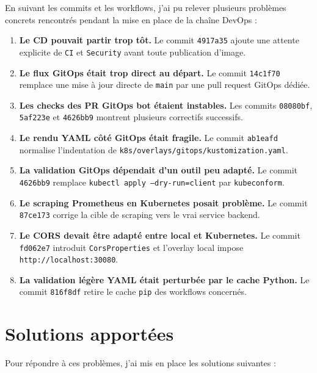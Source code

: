 \documentclass[10pt,a4paper]{article}
\begin{document}
En suivant les commits et les workflows, j'ai pu relever plusieurs problèmes concrets rencontrés pendant la mise en place de la chaîne DevOps :

\begin{enumerate}
\item \textbf{Le CD pouvait partir trop tôt.} Le commit \texttt{4917a35} ajoute une attente explicite de \texttt{CI} et \texttt{Security} avant toute publication d'image.
\item \textbf{Le flux GitOps était trop direct au départ.} Le commit \texttt{14c1f70} remplace une mise à jour directe de \texttt{main} par une pull request GitOps dédiée.
\item \textbf{Les checks des PR GitOps bot étaient instables.} Les commits \texttt{08080bf}, \texttt{5af223e} et \texttt{4626bb9} montrent plusieurs correctifs successifs.
\item \textbf{Le rendu YAML côté GitOps était fragile.} Le commit \texttt{ab1eafd} normalise l'indentation de \texttt{k8s/overlays/gitops/kustomization.yaml}.
\item \textbf{La validation GitOps dépendait d'un outil peu adapté.} Le commit \texttt{4626bb9} remplace \texttt{kubectl apply --dry-run=client} par \texttt{kubeconform}.
\item \textbf{Le scraping Prometheus en Kubernetes posait problème.} Le commit \texttt{87ce173} corrige la cible de scraping vers le vrai service backend.
\item \textbf{Le CORS devait être adapté entre local et Kubernetes.} Le commit \texttt{fd062e7} introduit \texttt{CorsProperties} et l'overlay local impose \texttt{http://localhost:30080}.
\item \textbf{La validation légère YAML était perturbée par le cache Python.} Le commit \texttt{816f8df} retire le cache \texttt{pip} des workflows concernés.
\end{enumerate}

\section{Solutions apportées}

Pour répondre à ces problèmes, j'ai mis en place les solutions suivantes :
\end{document}
